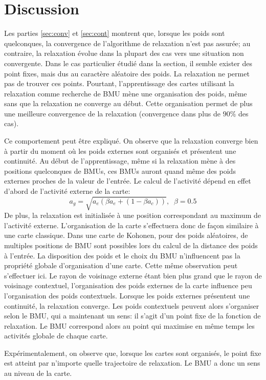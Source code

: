 \documentclass[../main]{subfiles}
\begin{document}
\section{Discussion}

Les parties \ref{sec:conv} et \ref{sec:cont} montrent que, lorsque les poids sont quelconques, la convergence de l'algorithme de relaxation n'est pas assurée; au contraire, la relaxation évolue dans la plupart des cas vers une situation non convergente. Dans le cas particulier étudié dans la section, il semble exister des point fixes, mais dus au caractère aléatoire des poids. La relaxation ne permet pas de trouver ces points. Pourtant, l'apprentissage des cartes utilisant la relaxation comme recherche de BMU mène une organisation des poids, même sans que la relaxation ne converge au début. Cette organisation permet de plus une meilleure convergence de la relaxation (convergence dans plus de $90 \%$ des cas).

Ce comportement peut être expliqué. On observe que la relaxation converge bien à partir du moment où les poids externes sont organisés et présentent une continuité. Au début de l'apprentissage, même si la relaxation mène à des positions quelconques de BMUs, ces BMUs auront quand même des poids externes proches de la valeur de l'entrée. Le calcul de l'activité dépend en effet d'abord de l'activité externe de la carte:
$$ a_g = \sqrt{a_e ( \beta a_e + (1-\beta a_c))}, \;\; \beta=0.5$$ 
De plus, la relaxation est initialisée à une position correspondant au maximum de l'activité externe.
L'organisation de la carte s'effectuera donc de façon similaire à une carte classique. Dans une carte de Kohonen, pour des poids aléatoires, de multiples positions de BMU sont possibles lors du calcul de la distance des poids à l'entrée. La disposition des poids et le choix du BMU n'influencent pas la propriété globale d'organisation d'une carte. Cette même observation peut s'effectuer ici. 
Le rayon de voisinage externe étant bien plus grand que le rayon de voisinage contextuel, l'organisation des poids externes de la carte influence peu l'organisation des poids contextuels.
Lorsque les poids externes présentent une continuité, la relaxation converge. Les poids contextuels peuvent alors s'organiser selon le BMU, qui a maintenant un sens: il s'agit d'un point fixe de la fonction de relaxation. Le BMU correspond alors au point qui maximise en même temps les activités globale de chaque carte.

Expérimentalement, on observe que, lorsque les cartes sont organisés, le point fixe est atteint par n'importe quelle trajectoire de relaxation. Le BMU a donc un sens au niveau de la carte. 
\end{document}
